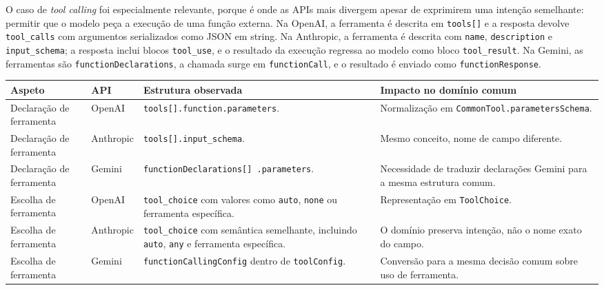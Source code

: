 \documentclass[11pt,a4paper]{report}
\begin{document}
    O caso de \textit{tool calling} foi especialmente relevante, porque é onde as APIs mais divergem apesar de exprimirem uma intenção semelhante: permitir que o modelo peça a execução de uma função externa. Na OpenAI, a ferramenta é descrita em \texttt{tools[]} e a resposta devolve \texttt{tool\_calls} com argumentos serializados como JSON em string. Na Anthropic, a ferramenta é descrita com \texttt{name}, \texttt{description} e \texttt{input\_schema}; a resposta inclui blocos \texttt{tool\_use}, e o resultado da execução regressa ao modelo como bloco \texttt{tool\_result}. Na Gemini, as ferramentas são \texttt{functionDeclarations}, a chamada surge em \texttt{functionCall}, e o resultado é enviado como \texttt{functionResponse}.

    \begin{table}[H]
        \centering
        \footnotesize
        \renewcommand{\arraystretch}{1.25}
        \begin{tabularx}{\textwidth}{|>{\raggedright\arraybackslash}p{2.4cm}|>{\raggedright\arraybackslash}p{1.8cm}|Y|Y|}
            \hline
            \textbf{Aspeto} & \textbf{API} & \textbf{Estrutura observada} & \textbf{Impacto no domínio comum} \\
            \hline
            Declaração de ferramenta & OpenAI & \texttt{tools[].function.parameters}. & Normalização em \texttt{CommonTool.parametersSchema}. \\
            \hline
            Declaração de ferramenta & Anthropic & \texttt{tools[].input\_schema}. & Mesmo conceito, nome de campo diferente. \\
            \hline
            Declaração de ferramenta & Gemini & \texttt{functionDeclarations[]
                .parameters}. & Necessidade de traduzir declarações Gemini para a mesma estrutura comum. \\
            \hline
            Escolha de ferramenta & OpenAI & \texttt{tool\_choice} com valores como \texttt{auto}, \texttt{none} ou ferramenta específica. & Representação em \texttt{ToolChoice}. \\
            \hline
            Escolha de ferramenta & Anthropic & \texttt{tool\_choice} com semântica semelhante, incluindo \texttt{auto}, \texttt{any} e ferramenta específica. & O domínio preserva intenção, não o nome exato do campo. \\
            \hline
            Escolha de ferramenta & Gemini & \texttt{functionCallingConfig} dentro de \texttt{toolConfig}. & Conversão para a mesma decisão comum sobre uso de ferramenta. \\

\end{tabularx}
\end{table}
\end{document}
